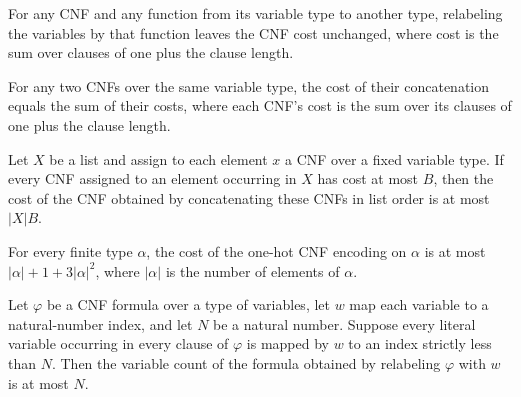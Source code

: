 \begin{theorem}
\label{Complexity.codecCnfCost_relabel}
\leanok
{}
For any CNF and any function from its variable type to another type, relabeling the
variables by that function leaves the CNF cost unchanged, where cost is the sum over
clauses of one plus the clause length.
\end{theorem}

\begin{theorem}
\label{Complexity.codecCnfCost_append}
\leanok
{}
For any two CNFs over the same variable type, the cost of their concatenation equals the
sum of their costs, where each CNF's cost is the sum over its clauses of one plus the
clause length.
\end{theorem}

\begin{theorem}
\label{Complexity.codecCnfCost_flatMap_le}
\leanok
{}
Let $X$ be a list and assign to each element $x$ a CNF over a fixed variable type. If
every CNF assigned to an element occurring in $X$ has cost at most $B$, then the cost of
the CNF obtained by concatenating these CNFs in list order is at most $|X|B$.
\end{theorem}

\begin{theorem}
\label{Complexity.codecOneHot_cost}
\leanok
{}
For every finite type $\alpha$, the cost of the one-hot CNF encoding on $\alpha$ is at
most $|\alpha|+1+3|\alpha|^2$, where $|\alpha|$ is the number of elements of $\alpha$.
\end{theorem}

\begin{theorem}
\label{Complexity.codecCnf_numVars}
\leanok
{}
Let $\varphi$ be a CNF formula over a type of variables, let $w$ map each variable to a
natural-number index, and let $N$ be a natural number. Suppose every literal variable
occurring in every clause of $\varphi$ is mapped by $w$ to an index strictly less than
$N$. Then the variable count of the formula obtained by relabeling $\varphi$ with $w$ is
at most $N$.
\end{theorem}

